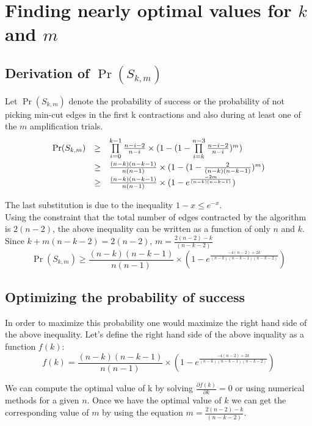 \providecommand{\f}[2]{\ensuremath{\cfrac{#1}{#2}}}

\section{Finding nearly optimal values for $k$ and $m$}
  \subsection{Derivation of $\Pr(S_{k, m})$}
  Let $\Pr(S_{k, m})$ denote the probability of success or the probability of not picking min-cut edges in the first k contractions and also during at least one of the $m$ amplification trials. \\

  \[\def\arraystretch{1.5}
    \begin{array}{l l l}
          \Pr(S_{k, m}) & \geq & \prod\limits_{i=0}^{k-1} \frac{n-i-2}{n-i} \times (1 - (1 - \prod\limits_{i=k}^{n-3} \frac{n-i-2}{n-i})^m) \\
               & \geq &  \frac{(n-k)(n-k-1)}{n(n-1)} \times (1 - (1 - \frac{2}{(n-k)(n-k-1)})^m) \\
               & \geq &  \frac{(n-k)(n-k-1)}{n(n-1)} \times (1 - e^{\frac{-2m}{(n-k)(n-k-1)}})
    \end{array}
  \]

  \noindent
  The last substitution is due to the inequality $1-x \leq e^{-x}$.\\
  Using the constraint that the total number of edges contracted by the algorithm is $2(n-2)$, the above inequality can be written as a function of only $n$ and $k$. Since $k+m(n-k-2) = 2(n-2)$, $m = \frac{2(n-2)-k}{(n-k-2)}$ \\
  \[
    \Pr(S_{k, m}) \geq \frac{(n-k)(n-k-1)}{n(n-1)} \times (1 - e^{\frac{-4(n-2)+2k}{(n-k)(n-k-1)(n-k-2)}})
  \]

  \subsection{Optimizing the probability of success}
  In order to maximize this probability one would maximize the right hand side of the above inequality. Let's define the right hand side of the above inquality as a function $f(k)$:
  \[
    f(k) = \frac{(n-k)(n-k-1)}{n(n-1)} \times (1 - e^{\frac{-4(n-2)+2k}{(n-k)(n-k-1)(n-k-2)}})
  \]

  We can compute the optimal value of k by solving $\frac{\partial f(k)}{\partial k} = 0$ or using numerical methods for a given $n$. Once we have the optimal value of $k$ we can get the corresponding value of $m$ by using the equation $m = \frac{2(n-2)-k}{(n-k-2)}$.

